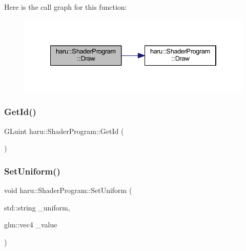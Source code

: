 Here is the call graph for this function\+:
\nopagebreak
\begin{figure}[H]
\begin{center}
\leavevmode
\includegraphics[width=334pt]{classharu_1_1_shader_program_af06e97b4b8eec4d8fd197f58df319206_cgraph}
\end{center}
\end{figure}
\mbox{\label{classharu_1_1_shader_program_a6079bce91bd203b0915d974035701cfd}} 
\subsubsection{\texorpdfstring{Get\+Id()}{GetId()}}
{\footnotesize\ttfamily G\+Luint haru\+::\+Shader\+Program\+::\+Get\+Id (\begin{DoxyParamCaption}{ }\end{DoxyParamCaption})}

\mbox{\label{classharu_1_1_shader_program_a558038555953abdd400d17b6af6a821b}} 
\subsubsection{\texorpdfstring{Set\+Uniform()}{SetUniform()}\hspace{0.1cm}{\footnotesize\ttfamily [1/5]}}
{\footnotesize\ttfamily void haru\+::\+Shader\+Program\+::\+Set\+Uniform (\begin{DoxyParamCaption}\item[{std\+::string}]{\+\_\+uniform,  }\item[{glm\+::vec4}]{\+\_\+value }\end{DoxyParamCaption})}

